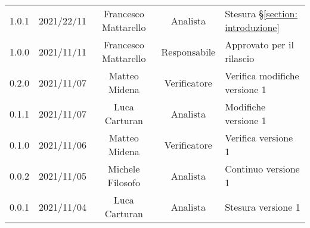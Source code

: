 \begin{center}
\begin{longtable}[c]{c | c | c | c | p{5cm}}
		1.0.1 & 2021/22/11 & Francesco Mattarello & Analista & Stesura §\ref{section: introduzione}\\
		1.0.0 & 2021/11/11 & Francesco Mattarello & Responsabile & Approvato per il rilascio\\
		0.2.0 & 2021/11/07 & Matteo Midena & Verificatore & Verifica modifiche versione 1\\
		0.1.1 & 2021/11/07 & Luca Carturan & Analista & Modifiche versione 1\\
		0.1.0 & 2021/11/06 & Matteo Midena & Verificatore & Verifica versione 1\\
		0.0.2 & 2021/11/05 & Michele Filosofo & Analista & Continuo versione 1\\
		0.0.1 & 2021/11/04 & Luca Carturan & Analista &Stesura versione 1\\

	\end{longtable}
\end{center}